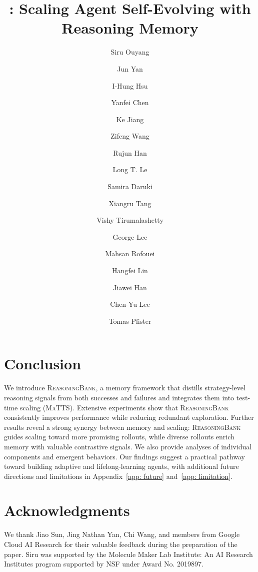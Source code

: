 \documentclass[11pt, a4paper, logo, copyright]{googlecloud}
\title{\ours{}: Scaling Agent Self-Evolving with Reasoning Memory}
\author[1*]{Siru Ouyang}
\author[2$\dagger$]{Jun Yan}
\author[2]{I-Hung Hsu}
\author[2]{Yanfei Chen}
\author[2]{Ke Jiang}
\author[2]{Zifeng Wang}
\author[2]{Rujun Han}
\author[2]{Long T. Le}
\author[2]{Samira Daruki}
\author[3]{Xiangru Tang}
\author[2]{Vishy Tirumalashetty}
\author[2]{George Lee}
\author[4]{Mahsan Rofouei}
\author[4]{Hangfei Lin}
\author[1]{Jiawei Han}
\author[2$\dagger$]{Chen-Yu Lee}
\author[2]{Tomas Pfister}
\affil[1]{University of Illinois Urbana-Champaign}
\affil[2]{Google Cloud AI Research}
\affil[3]{Yale University}
\affil[4]{Google Cloud AI}
\newcommand{\ours}{\textsc{ReasoningBank}\xspace}
\newcommand{\mats}{\textsc{MaTTS}\xspace}
\begin{document}
\maketitle







\section{Conclusion}

We introduce \ours{}, a memory framework that distills strategy-level reasoning signals from both successes and failures and integrates them into test-time scaling (\mats). Extensive experiments show that \ours{} consistently improves performance while reducing redundant exploration. Further results reveal a strong synergy between memory and scaling: \ours{} guides scaling toward more promising rollouts, while diverse rollouts enrich memory with valuable contrastive signals. We also provide analyses of individual components and emergent behaviors. Our findings suggest a practical pathway toward building adaptive and lifelong-learning agents, with additional future directions and limitations in Appendix~\ref{app: future} and~\ref{app: limitation}.

\section{Acknowledgments}
We thank Jiao Sun, Jing Nathan Yan, Chi Wang, and members from Google Cloud AI Research for their valuable feedback during the preparation of the paper. Siru was supported by the Molecule Maker Lab Institute: An AI Research Institutes program supported by NSF under Award No. 2019897.


\nobibliography*


\clearpage
\appendix

\end{document}
